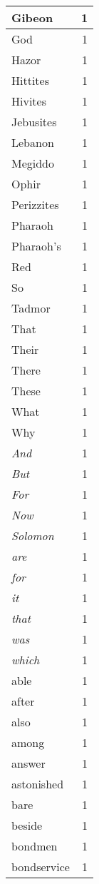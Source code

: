 \begin{center}
\begin{longtable}{l|r}
Gibeon & 1 \\ \hline
God & 1 \\ \hline
Hazor & 1 \\ \hline
Hittites & 1 \\ \hline
Hivites & 1 \\ \hline
Jebusites & 1 \\ \hline
Lebanon & 1 \\ \hline
Megiddo & 1 \\ \hline
Ophir & 1 \\ \hline
Perizzites & 1 \\ \hline
Pharaoh & 1 \\ \hline
Pharaoh's & 1 \\ \hline
Red & 1 \\ \hline
So & 1 \\ \hline
Tadmor & 1 \\ \hline
That & 1 \\ \hline
Their & 1 \\ \hline
There & 1 \\ \hline
These & 1 \\ \hline
What & 1 \\ \hline
Why & 1 \\ \hline
\emph{And} & 1 \\ \hline
\emph{But} & 1 \\ \hline
\emph{For} & 1 \\ \hline
\emph{Now} & 1 \\ \hline
\emph{Solomon} & 1 \\ \hline
\emph{are} & 1 \\ \hline
\emph{for} & 1 \\ \hline
\emph{it} & 1 \\ \hline
\emph{that} & 1 \\ \hline
\emph{was} & 1 \\ \hline
\emph{which} & 1 \\ \hline
able & 1 \\ \hline
after & 1 \\ \hline
also & 1 \\ \hline
among & 1 \\ \hline
answer & 1 \\ \hline
astonished & 1 \\ \hline
bare & 1 \\ \hline
beside & 1 \\ \hline
bondmen & 1 \\ \hline
bondservice & 1 \\ \hline

\end{longtable}
\end{center}

